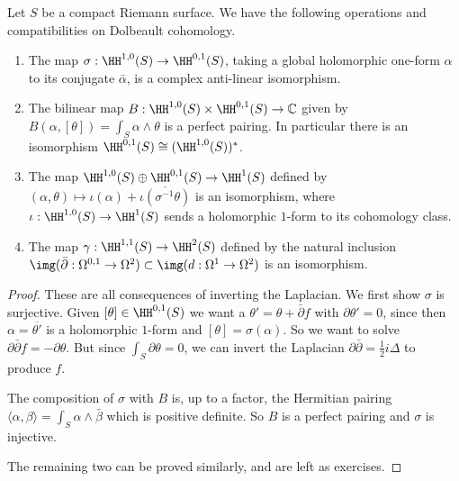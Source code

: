 \begin{theorem}
    Let \(S\) be a compact Riemann surface. We have the following operations and
    compatibilities on Dolbeault cohomology.
    \begin{enumerate}
        \item The map \(\sigma:\HH^{1,0}(S)\to \HH^{0,1}(S)\), taking a global
        holomorphic one-form \(\alpha\) to its conjugate \(\bar\alpha\), is a
        complex anti-linear isomorphism.
        \item The bilinear map \(B:\HH^{1,0}(S)\times\HH^{0,1}(S)\to
            \mathbb{C}\) given by \(B(\alpha, [\theta])=\int_S \alpha\wedge
            \theta\) is a perfect pairing. In particular there is an isomorphism
            \(\HH^{0,1}(S)\cong (\HH^{1,0}(S))^\ast\).
        \item The map \(\HH^{1,0}(S)\oplus \HH^{0,1}(S)\to \HH^1(S)\) defined by
        \((\alpha,\theta)\mapsto
        \iota(\alpha)+\overline{\iota(\sigma^{-1}\theta)}\) is an isomorphism,
        where \(\iota:\HH^{1,0}(S)\to \HH^1(S)\) sends a holomorphic \(1\)-form
        to its cohomology class.
        \item The map \(\gamma:\HH^{1,1}(S)\to \HH^2(S)\) defined by the natural
        inclusion \(\img(\bar\partial:\Omega^{0,1}\to \Omega^2)\subset
        \img(d:\Omega^1\to \Omega^2)\) is an isomorphism.
    \end{enumerate}
    \begin{proof}
        These are all consequences of inverting the Laplacian. We first show
        \(\sigma\) is surjective. Given \([\theta]\in \HH^{0,1}(S)\) we want a
        \(\theta'=\theta+\bar\partial f\) with \(\partial \theta'=0\), since
        then \(\alpha=\overline{\theta'}\) is a holomorphic \(1\)-form and
        \([\theta]=\sigma(\alpha)\). So we want to solve \(\partial
        \bar\partial f = -\partial \theta\). But since \(\int_S\partial
        \theta =0\), we can invert the Laplacian \(\partial
        \bar\partial=\frac{1}{2}i\Delta\) to produce \(f\).

        The composition of \(\sigma\) with \(B\) is, up to a factor, the
        Hermitian pairing \(\langle \alpha, \beta \rangle=\int_S
        \alpha\wedge \bar\beta\) which is positive definite. So \(B\) is a
        perfect pairing and \(\sigma\) is injective.

        The remaining two can be proved similarly, and are left as exercises.
    \end{proof}
\end{theorem}

